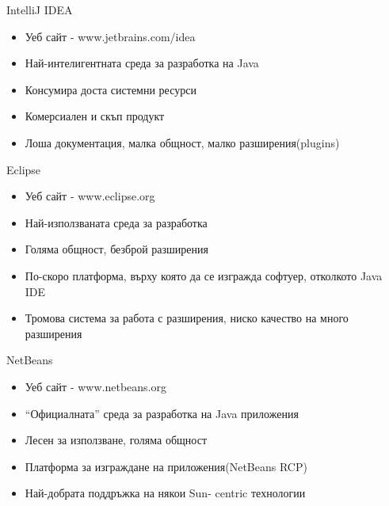 \documentclass{beamer}
\begin{document}
\begin{frame}{IntelliJ IDEA}
  \transdissolve
  \begin{itemize}
    \item Уеб сайт - www.jetbrains.com/idea
    \item Най-интелигентната среда за
    разработка на Java
    \item Консумира доста системни ресурси
    \item Комерсиален и скъп продукт
    \item Лоша документация, малка общност,
    малко разширения(plugins)
  \end{itemize}
\end{frame}

\begin{frame}{Eclipse}
  \transdissolve
  \begin{itemize}
    \item Уеб сайт - www.eclipse.org
    \item Най-използваната среда за разработка
    \item Голяма общност, безброй разширения
    \item По-скоро платформа, върху която да се
    изгражда софтуер, отколкото Java IDE
    \item Тромова система за работа с
    разширения, ниско качество на много
    разширения
  \end{itemize}
\end{frame}

\begin{frame}{NetBeans}
  \transdissolve  
  \begin{itemize}
    \item Уеб сайт - www.netbeans.org
    \item “Официалната” среда за разработка на
    Java приложения
    \item Лесен за използване, голяма общност
    \item Платформа за изграждане на приложения(NetBeans RCP)
    \item Най-добрата поддръжка на някои Sun-
    centric технологии
  \end{itemize}
\end{frame}
\end{document}
